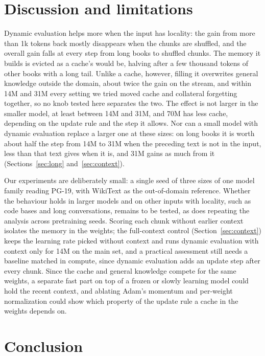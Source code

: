 \documentclass[times,twocolumn,final,authoryear]{elsarticle}
\begin{document}
\section{Discussion and limitations}

Dynamic evaluation helps more when the input has locality: the gain from more than 1k tokens back mostly disappears when the chunks are shuffled, and the overall gain falls at every step from long books to shuffled chunks.
The memory it builds is evicted as a cache's would be, halving after a few thousand tokens of other books with a long tail.
Unlike a cache, however, filling it overwrites general knowledge outside the domain, about twice the gain on the stream, and within 14M and 31M every setting we tried moved cache and collateral forgetting together, so no knob tested here separates the two.
The effect is not larger in the smaller model, at least between 14M and 31M, and 70M has less cache, depending on the update rule and the step it allows.
Nor can a small model with dynamic evaluation replace a larger one at these sizes: on long books it is worth about half the step from 14M to 31M when the preceding text is not in the input, less than that text gives when it is, and 31M gains as much from it (Sections~\ref{sec:long} and~\ref{sec:context}).

Our experiments are deliberately small: a single seed of three sizes of one model family reading PG-19, with WikiText as the out-of-domain reference.
Whether the behaviour holds in larger models and on other inputs with locality, such as code bases and long conversations, remains to be tested, as does repeating the analysis across pretraining seeds.
Scoring each chunk without earlier context isolates the memory in the weights; the full-context control (Section~\ref{sec:context}) keeps the learning rate picked without context and runs dynamic evaluation with context only for 14M on the main set, and a practical assessment still needs a baseline matched in compute, since dynamic evaluation adds an update step after every chunk.
Since the cache and general knowledge compete for the same weights, a separate fast part on top of a frozen or slowly learning model could hold the recent context, and ablating Adam's momentum and per-weight normalization could show which property of the update rule a cache in the weights depends on.

\section{Conclusion}
\end{document}
